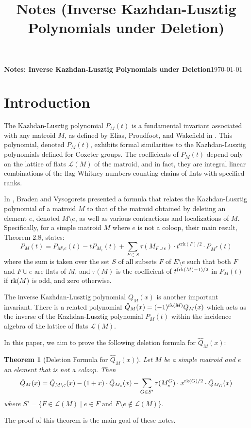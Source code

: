\documentclass[11pt]{article}
\title{\texorpdfstring{Notes (Inverse Kazhdan-Lusztig Polynomials under Deletion)}{Notes (Inverse Kazhdan-Lusztig Polynomials under Deletion)}}
\newcommand{\calL}{\mathcal{L}}
\newcommand{\rank}{\normalfont\text{rk}}
\newtheorem{theorem}{Theorem}
\theoremstyle{remark}
\begin{document}
{\textbf{Notes: Inverse Kazhdan-Lusztig Polynomials under Deletion}}\hfill {\small{\today}}

\hrulefill %

\section{Introduction}
The Kazhdan-Lusztig polynomial $P_M(t)$ is a fundamental invariant associated with any matroid $M$,
as defined by Elias, Proudfoot, and Wakefield in \cite{EPW16}. This polynomial, denoted $P_M(t)$,
exhibits formal similarities to the Kazhdan-Lusztig polynomials defined for Coxeter groups.
The coefficients of $P_M(t)$ depend only on the lattice of flats $\calL(M)$ of the matroid,
and in fact, they are integral linear combinations of the flag Whitney numbers counting chains of flats
with specified ranks.

In \cite{Bra19}, Braden and Vysogorets presented a formula that relates the Kazhdan-Lusztig polynomial
of a matroid $M$ to that of the matroid obtained by deleting an element $e$, denoted $M\setminus e$, as well as various contractions and localizations of $M$. Specifically, for a simple matroid $M$ where $e$ is not a coloop, their main result, Theorem 2.8, states:
\[
    P_M(t) = P_{M\setminus e}(t) - tP_{M_e}(t) + \sum_{F\in S} \tau(M_{F\cup e})\cdot
    t^{\text{crk}(F)/2}\cdot P_{M^F}(t)
\]
where the sum is taken over the set $S$ of all subsets $F$ of $E \setminus e$ such that both $F$ and $F \cup e$ are flats of $M$, and $\tau(M)$ is the coefficient of $t^{(\rank(M)-1)/2}$ in $P_M(t)$ if $\rank(M)$ is odd, and zero otherwise.

The inverse Kazhdan-Lusztig polynomial $Q_M(x)$ is another important invariant.
There is a related polynomial $\hat{Q}_M(x) = (-1)^{\rank(M)} Q_M(x)$ which acts as the inverse of
the Kazhdan-Lusztig polynomial $P_M(t)$ within the incidence algebra of the lattice of flats $\calL(M)$.

In this paper, we aim to prove the following deletion formula for $\hat{Q}_M(x)$:
\begin{theorem}[Deletion Formula for $\hat{Q}_M(x)$]
    \label{thm:deletion_formula_Q_hat}
    Let $M$ be a simple matroid and $e$ an element that is not a coloop. Then
    \[
        \hat{Q}_M(x) = \hat{Q}_{M\setminus e}(x) -(1 + x)\cdot \hat{Q}_{M_e}(x) -
        \sum_{G \in S'}{\tau(M^G_e)\cdot x^{\rank(G)/2}\cdot
            \hat{Q}_{M_G}(x)}
    \]
    where $S' = \{F\in \calL(M)\mid e\in F \text{ and } F\setminus e \notin \calL(M)\}$.
\end{theorem}
The proof of this theorem is the main goal of these notes.
\end{document}
